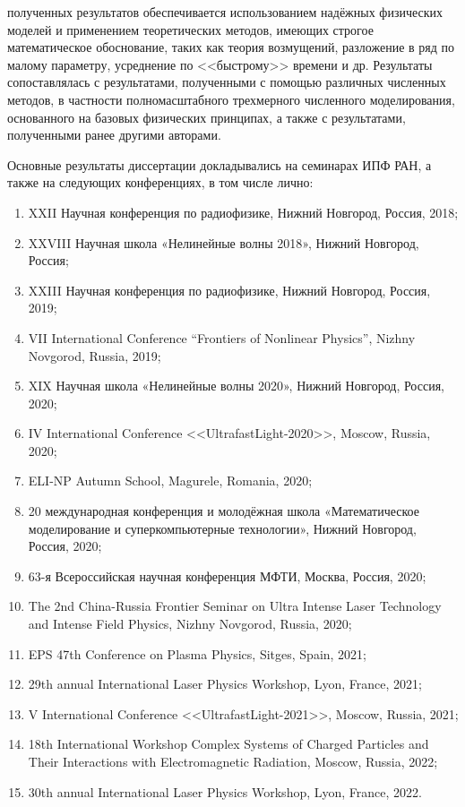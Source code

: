 \vspace{0.25cm}
{\reliability} полученных результатов обеспечивается использованием надёжных физических моделей и применением теоретических методов, имеющих строгое математическое обоснование, таких как теория возмущений,
разложение в ряд по малому параметру, усреднение по <<быстрому>> времени и др. 
Результаты сопоставлялась с результатами, полученными с помощью различных численных методов, в частности полномасштабного трехмерного численного моделирования, основанного на базовых физических принципах, а также с результатами, полученными ранее другими авторами.

\vspace{0.25cm}
{\probation}
Основные результаты диссертации докладывались на семинарах ИПФ РАН, а также на следующих конференциях, в том числе лично:
\begin{enumerate}
    \item XXII Научная конференция по радиофизике, Нижний Новгород, Россия, 2018;
    \item XXVIII Научная школа «Нелинейные волны 2018», Нижний Новгород, Россия;
    \item XXIII Научная конференция по радиофизике, Нижний Новгород, Россия, 2019;
    \item VII International Conference “Frontiers of Nonlinear Physics”, Nizhny Novgorod, Russia, 2019;
    \item XIX Научная школа «Нелинейные волны 2020», Нижний Новгород, Россия, 2020;
    \item IV International Conference <<UltrafastLight-2020>>, Moscow, Russia, 2020;
    \item ELI-NP Autumn School, Magurele, Romania, 2020;
    \item 20 международная конференция и молодёжная школа «Математическое моделирование и суперкомпьютерные технологии», Нижний Новгород, Россия, 2020;
    \item 63-я Всероссийская научная конференция МФТИ, Москва, Россия, 2020;
    \item The 2nd China-Russia Frontier Seminar on Ultra Intense Laser Technology and Intense Field Physics, Nizhny Novgorod, Russia, 2020;
    \item EPS 47th Conference on Plasma Physics, Sitges, Spain, 2021;
    \item 29th annual International Laser Physics Workshop, Lyon, France, 2021;
    \item V International Conference <<UltrafastLight-2021>>, Moscow, Russia, 2021;
    \item 18th International Workshop Complex Systems of Charged Particles and Their Interactions with Electromagnetic Radiation, Moscow, Russia, 2022;
    \item 30th annual International Laser Physics Workshop, Lyon, France, 2022.
\end{enumerate}

